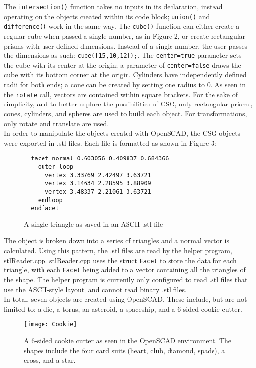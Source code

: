 \documentclass[12pt]{article}
\begin{document}
\begin{doublespace}
The \texttt{intersection()} function takes no inputs in its declaration, instead operating on the objects created within its code block; \texttt{union()} and \texttt{difference()} work in the same way. The \texttt{cube()} function can either create a regular cube when passed a single number, as in Figure 2, or create rectangular prisms with user-defined dimensions. Instead of a single number, the user  passes the dimensions as such: \texttt{cube([15,10,12]);}. The \texttt{center=true} parameter sets the cube with its center at the origin; a parameter of \texttt{center=false} draws the cube with its bottom corner at the origin. Cylinders have independently defined radii for both ends; a cone can be created by setting one radius to 0. As seen in the \texttt{rotate} call, vectors are contained within square brackets. For the sake of simplicity, and to better explore the possibilities of CSG, only rectangular prisms, cones, cylinders, and spheres are used to build each object. For transformations, only rotate and translate are used.\\

In order to manipulate the objects created with OpenSCAD, the CSG objects were exported in .stl files. Each file is formatted as shown in Figure 3:
\begin{figure}[h]
\begin{lstlisting}
  facet normal 0.603056 0.409837 0.684366
    outer loop
      vertex 3.33769 2.42497 3.63721
      vertex 3.14634 2.28595 3.88909
      vertex 3.48337 2.21061 3.63721
    endloop
  endfacet
\end{lstlisting}
\centering
\caption{A single triangle as saved in an ASCII .stl file}
\end{figure}

The object is broken down into a series of triangles and a normal vector is calculated. Using this pattern, the .stl files are read by the helper program, stlReader.cpp. stlReader.cpp uses the struct \texttt{Facet} to store the data for each triangle, with each \texttt{Facet} being added to a vector containing all the triangles of the shape. The helper program is currently only configured to read .stl files that use the ASCII-style layout, and cannot read binary .stl files.\\

In total, seven objects are created using OpenSCAD. These include, but are not limited to: a die, a torus, an asteroid, a spaceship, and a 6-sided cookie-cutter.
\begin{figure}[h]
  \texttt{[image: Cookie]}
  \centering
  \caption{A 6-sided cookie cutter as seen in the OpenSCAD environment. The shapes include the four card suits (heart, club, diamond, spade), a cross, and a star.}
\end{figure}

\end{doublespace}
\end{document}
